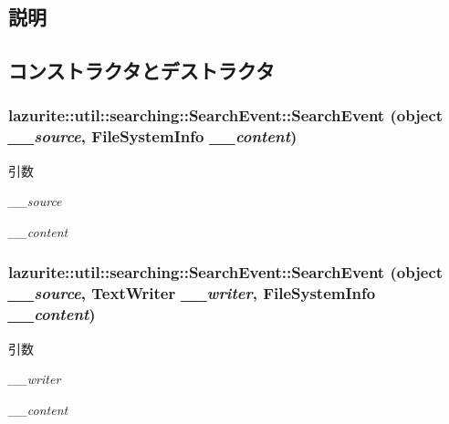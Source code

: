 \subsection{説明}


\subsection{コンストラクタとデストラクタ}
\hypertarget{classlazurite_1_1util_1_1searching_1_1_search_event_a30ec549414885afdea9a28482858a477}{
\subsubsection[{SearchEvent}]{\setlength{\rightskip}{0pt plus 5cm}lazurite::util::searching::SearchEvent::SearchEvent (object {\em \_\-\_\-source}, \/  FileSystemInfo {\em \_\-\_\-content})}}
\label{classlazurite_1_1util_1_1searching_1_1_search_event_a30ec549414885afdea9a28482858a477}

\begin{DoxyParams}{引数}
\item[{\em \_\-\_\-source}]\item[{\em \_\-\_\-content}]\end{DoxyParams}
\hypertarget{classlazurite_1_1util_1_1searching_1_1_search_event_abd519797dff87df425c2e66257394b70}{
\subsubsection[{SearchEvent}]{\setlength{\rightskip}{0pt plus 5cm}lazurite::util::searching::SearchEvent::SearchEvent (object {\em \_\-\_\-source}, \/  TextWriter {\em \_\-\_\-writer}, \/  FileSystemInfo {\em \_\-\_\-content})}}
\label{classlazurite_1_1util_1_1searching_1_1_search_event_abd519797dff87df425c2e66257394b70}

\begin{DoxyParams}{引数}
\item[{\em \_\-\_\-writer}]\item[{\em \_\-\_\-content}]\end{DoxyParams}


